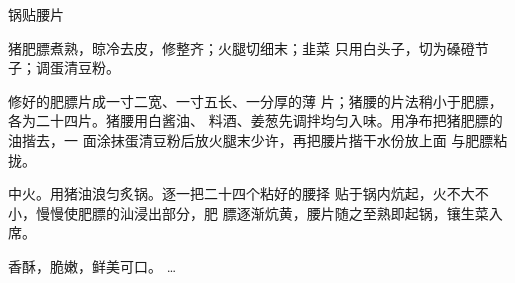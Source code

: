 \begin{recipe}{锅贴腰片}

\ingredients


\cooking

\step 猪肥膘煮熟，晾冷去皮，修整齐；火腿切细末；韭菜 只用白头子，切为磉磴节子；调蛋清豆粉。

\step 修好的肥膘片成一寸二宽、一寸五长、一分厚的薄 片；猪腰的片法稍小于肥膘，各为二十四片。猪腰用白酱油、 料酒、姜葱先调拌均匀入味。用净布把猪肥膘的油揩去，一 面涂抹蛋清豆粉后放火腿末少许，再把腰片揩干水份放上面 与肥膘粘拢。

\step 中火。用猪油浪匀炙锅。逐一把二十四个粘好的腰择 贴于锅内炕起，火不大不小，慢慢使肥膘的汕浸出部分，肥 膘逐渐炕黄，腰片随之至熟即起锅，镶生菜入席。

\notes

香酥，脆嫩，鲜美可口。	…

\end{recipe}

